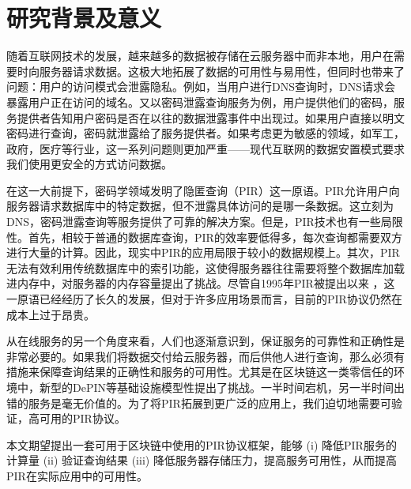 \section{研究背景及意义}

随着互联网技术的发展，越来越多的数据被存储在云服务器中而非本地，用户在需要时向服务器请求数据。这极大地拓展了数据的可用性与易用性，但同时也带来了问题：用户的访问模式会泄露隐私。例如，当用户进行DNS查询时，DNS请求会暴露用户正在访问的域名。又以密码泄露查询服务为例，用户提供他们的密码，服务提供者告知用户密码是否在以往的数据泄露事件中出现过。如果用户直接以明文密码进行查询，密码就泄露给了服务提供者。如果考虑更为敏感的领域，如军工，政府，医疗等行业，这一系列问题则更加严重——现代互联网的数据安置模式要求我们使用更安全的方式访问数据。

在这一大前提下，密码学领域发明了隐匿查询（PIR）这一原语。PIR允许用户向服务器请求数据库中的特定数据，但不泄露具体访问的是哪一条数据。这立刻为DNS，密码泄露查询等服务提供了可靠的解决方案。但是，PIR技术也有一些局限性。首先，相较于普通的数据库查询，PIR的效率要低得多，每次查询都需要双方进行大量的计算。因此，现实中PIR的应用局限于较小的数据规模上。其次，PIR无法有效利用传统数据库中的索引功能，这使得服务器往往需要将整个数据库加载进内存中，对服务器的内存容量提出了挑战。尽管自1995年PIR被提出以来 \cite{FOCS:CGKS95}，这一原语已经经历了长久的发展，但对于许多应用场景而言，目前的PIR协议仍然在成本上过于昂贵。

从在线服务的另一个角度来看，人们也逐渐意识到，保证服务的可靠性和正确性是非常必要的。如果我们将数据交付给云服务器，而后供他人进行查询，那么必须有措施来保障查询结果的正确性和服务的可用性。尤其是在区块链这一类零信任的环境中，新型的DePIN等基础设施模型性提出了挑战。一半时间宕机，另一半时间出错的服务是毫无价值的。为了将PIR拓展到更广泛的应用上，我们迫切地需要可验证，高可用的PIR协议。

本文期望提出一套可用于区块链中使用的PIR协议框架，能够 (i) 降低PIR服务的计算量 (ii) 验证查询结果 (iii) 降低服务器存储压力，提高服务可用性，从而提高PIR在实际应用中的可用性。